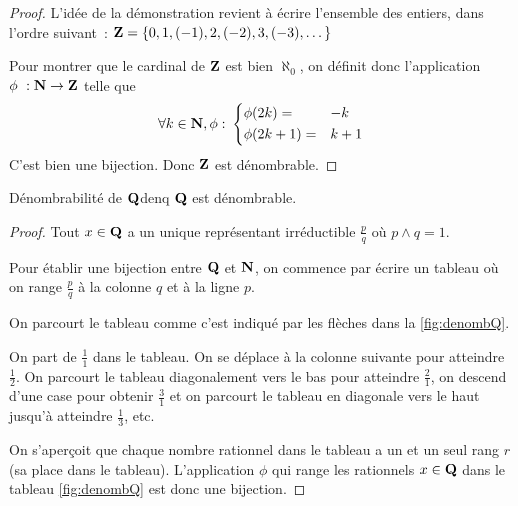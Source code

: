 \documentclass[a4paper,french,final]{memoir}
\begin{document}
\begin{proof}
L'idée de la démonstration revient à écrire l'ensemble des entiers, dans l'ordre suivant~:  $\mathbf{Z}=\left\lbrace 0,1,(-1),2,(-2),3,(-3),\dots\right\rbrace$

Pour montrer que le cardinal de $\mathbf{Z}$ est bien $\aleph_0$, on définit donc l'application $\phi~: \NN \to \ZZ$ telle que
\[ \forall k \in \NN, \phi\,\colon
	\begin{dcases}
	\phi(2k)=& -k \\
	\phi(2k + 1)=& k+1
	\end{dcases}\]
	C'est bien une bijection. Donc $\mathbf{Z}$ est dénombrable.
\end{proof}
\begin{theoremb}{Dénombrabilité de $\mathbf{Q}$}{denq}
	$\mathbf{Q}$ est dénombrable.
\end{theoremb}
\begin{proof}
	Tout $x \in \mathbf{Q}$ a un unique représentant irréductible $\frac{p}{q}$ où $p \wedge q = 1$.

	Pour établir une bijection entre $\mathbf{Q}$ et $\mathbf{N}$, on commence par écrire un tableau où on range $\frac{p}{q}$ à la colonne $q$ et à la ligne $p$.

	On parcourt le tableau comme c'est indiqué par les flèches dans la \cref{fig:denombQ}.

	\noindent On part de $\frac{1}{1}$ dans le tableau. On se déplace à la colonne suivante pour atteindre $\frac{1}{2}$. On parcourt le tableau diagonalement vers le bas pour atteindre $\frac{2}{1}$, on descend d'une case pour obtenir $\frac{3}{1}$ et on parcourt le tableau en diagonale vers le haut jusqu'à atteindre $\frac{1}{3}$, etc.

	On s'aperçoit que chaque nombre rationnel dans le tableau a un et un seul rang $r$ (sa place dans le tableau). L'application $\phi$ qui range les rationnels $x \in \mathbf{Q}$ dans le tableau \cref{fig:denombQ} est donc une bijection.
\end{proof}
\end{document}
